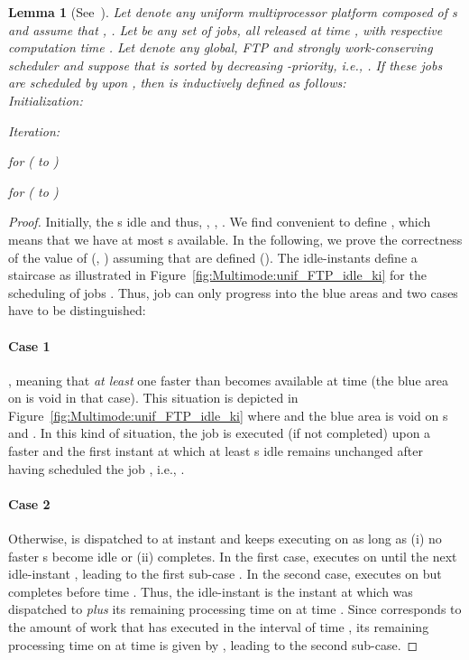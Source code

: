 \documentclass{article}
\newtheorem{validity test}{Validity Test}
\newtheorem{Lemma}{Lemma}
\newtheorem{proof}{Proof}
\begin{document}
\begin{Lemma}[See~\cite{MeumeuNelisGoossens:10}]
\label{lem:Multimode:unif_FTP_idle_ki}
Let  denote any uniform multiprocessor platform composed of  s and assume that , . Let  be any set of  jobs, all released at time , with respective computation time . Let  denote any global, FTP and strongly work-conserving scheduler and suppose that  is sorted by decreasing -priority, i.e., . If these jobs are scheduled by  upon , then  is inductively defined as follows: \\

\noindent Initialization:


\noindent Iteration:

for ( to )

\hspace{0.2cm} for ( to ) \\

\noindent  

\end{Lemma} 
\begin{proof} 
Initially, the  s idle and thus, , , . We find convenient to define , which means that we have at most  s available. In the following, we prove the correctness of the value of  (, ) assuming that  are defined (). The idle-instants  define a staircase as illustrated in Figure~\ref{fig:Multimode:unif_FTP_idle_ki} for the scheduling of jobs . Thus, job  can only progress into the blue areas and two cases have to be distinguished:

\paragraph{Case 1} , meaning that \emph{at least} one  faster than  becomes available at time  (the blue area on   is void in that case). This situation is depicted in Figure~\ref{fig:Multimode:unif_FTP_idle_ki} where  and the blue area is void on s  and . In this kind of situation, the job  is executed (if not completed) upon a faster  and the first instant at which at least  s idle remains unchanged after having scheduled the job , i.e., .

\paragraph{Case 2} Otherwise,  is dispatched to   at instant  and keeps executing on  as long as (i) no faster s become idle or (ii)  completes. In the first case,  executes on  until the next idle-instant , leading to the first sub-case . In the second case,  executes on   but completes before time . Thus, the idle-instant  is the instant  at which  was dispatched to  \emph{plus} its remaining processing time on   at time . Since  corresponds to the amount of work that  has executed in the interval of time , its remaining processing time on   at time  is given by , leading to the second sub-case. 
\end{proof}
\end{document}
